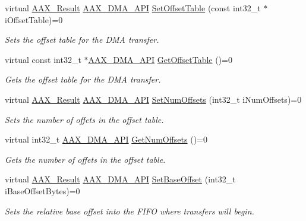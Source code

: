 \begin{Indent}
\begin{DoxyCompactItemize}
virtual \mbox{\hyperlink{a00392_a4d8f69a697df7f70c3a8e9b8ee130d2f}{A\+A\+X\+\_\+\+Result}} \mbox{\hyperlink{a00587_acae60d01e5e4bd3282369d0d9d378f3f}{A\+A\+X\+\_\+\+D\+M\+A\+\_\+\+A\+PI}} \mbox{\hyperlink{a01809_a9a106088088a8fc812b137bd90c0fa3a}{Set\+Offset\+Table}} (const int32\+\_\+t $\ast$i\+Offset\+Table)=0
\begin{DoxyCompactList}\small\item\em Sets the offset table for the D\+MA transfer. \end{DoxyCompactList}\item 
virtual const int32\+\_\+t $\ast$\mbox{\hyperlink{a00587_acae60d01e5e4bd3282369d0d9d378f3f}{A\+A\+X\+\_\+\+D\+M\+A\+\_\+\+A\+PI}} \mbox{\hyperlink{a01809_ab00bbebfffe925b8332eade3457d706e}{Get\+Offset\+Table}} ()=0
\begin{DoxyCompactList}\small\item\em Gets the offset table for the D\+MA transfer. \end{DoxyCompactList}\item 
virtual \mbox{\hyperlink{a00392_a4d8f69a697df7f70c3a8e9b8ee130d2f}{A\+A\+X\+\_\+\+Result}} \mbox{\hyperlink{a00587_acae60d01e5e4bd3282369d0d9d378f3f}{A\+A\+X\+\_\+\+D\+M\+A\+\_\+\+A\+PI}} \mbox{\hyperlink{a01809_a58f2933fda57ac6a1cdf20cce96aceac}{Set\+Num\+Offsets}} (int32\+\_\+t i\+Num\+Offsets)=0
\begin{DoxyCompactList}\small\item\em Sets the number of offets in the offset table. \end{DoxyCompactList}\item 
virtual int32\+\_\+t \mbox{\hyperlink{a00587_acae60d01e5e4bd3282369d0d9d378f3f}{A\+A\+X\+\_\+\+D\+M\+A\+\_\+\+A\+PI}} \mbox{\hyperlink{a01809_a582df429c4f543d66d63c87e2ea3a1e2}{Get\+Num\+Offsets}} ()=0
\begin{DoxyCompactList}\small\item\em Gets the number of offets in the offset table. \end{DoxyCompactList}\item 
virtual \mbox{\hyperlink{a00392_a4d8f69a697df7f70c3a8e9b8ee130d2f}{A\+A\+X\+\_\+\+Result}} \mbox{\hyperlink{a00587_acae60d01e5e4bd3282369d0d9d378f3f}{A\+A\+X\+\_\+\+D\+M\+A\+\_\+\+A\+PI}} \mbox{\hyperlink{a01809_ac3a22df0462c7f4888a429b3eadae4dd}{Set\+Base\+Offset}} (int32\+\_\+t i\+Base\+Offset\+Bytes)=0
\begin{DoxyCompactList}\small\item\em Sets the relative base offset into the F\+I\+FO where transfers will begin. \end{DoxyCompactList}\item 

\end{DoxyCompactItemize}
\end{Indent}
